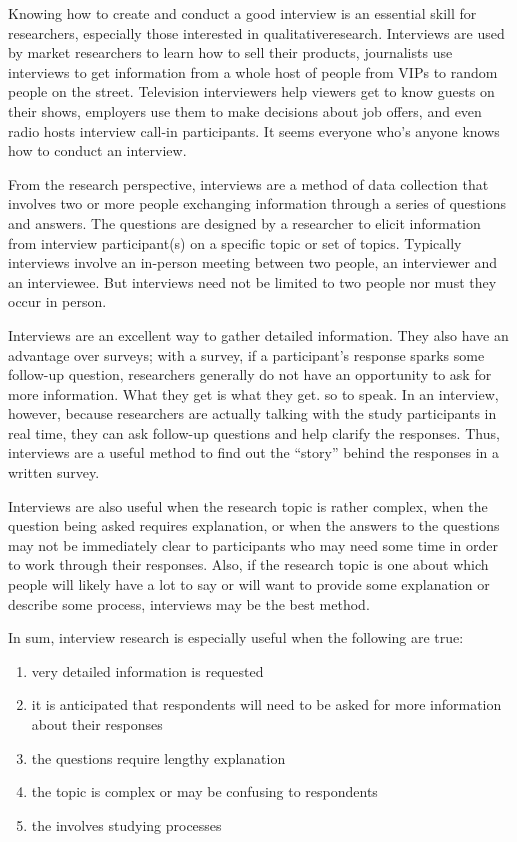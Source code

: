 Knowing how to create and conduct a good interview is an essential skill for researchers, especially those interested in \gls{qualitativeresearch}. Interviews are used by market researchers to learn how to sell their products, journalists use interviews to get information from a whole host of people from VIPs to random people on the street. Television interviewers help viewers get to know guests on their shows, employers use them to make decisions about job offers, and even radio hosts interview call-in participants. It seems everyone who's anyone knows how to conduct an interview.

From the research perspective, interviews are a method of data collection that involves two or more people exchanging information through a series of questions and answers. The questions are designed by a researcher to elicit information from interview participant(s) on a specific topic or set of topics. Typically interviews involve an in-person meeting between two people, an interviewer and an interviewee. But interviews need not be limited to two people nor must they occur in person.

Interviews are an excellent way to gather detailed information. They also have an advantage over surveys; with a survey, if a participant's response sparks some follow-up question, researchers generally do not have an opportunity to ask for more information. What they get is what they get. so to speak. In an interview, however, because researchers are actually talking with the study participants in real time, they can ask follow-up questions and help clarify the responses. Thus, interviews are a useful method to find out the ``story'' behind the responses in a written survey.

Interviews are also useful when the research topic is rather complex, when the question being asked requires explanation, or when the answers to the questions may not be immediately clear to participants who may need some time in order to work through their responses. Also, if the research topic is one about which people will likely have a lot to say or will want to provide some explanation or describe some process, interviews may be the best method. 

In sum, interview research is especially useful when the following are true:

\begin{enumerate}
	\item very detailed information is requested
	\item it is anticipated that respondents will need to be asked for more information about their responses
	\item the questions require lengthy explanation
	\item the topic is complex or may be confusing to respondents
	\item the involves studying processes
\end{enumerate}

